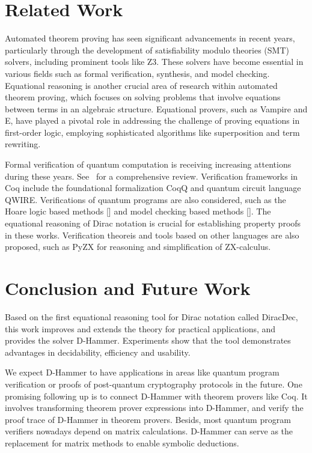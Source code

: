 
\section{Related Work}

Automated theorem proving has seen significant advancements in recent years, particularly through the development of satisfiability modulo theories (SMT) solvers,
including prominent tools like Z3. These solvers have become essential in various fields such as formal verification, synthesis, and model checking. 
Equational reasoning is another crucial area of research within automated theorem proving, which focuses on solving problems that involve equations between terms in an algebraic structure. 
Equational provers, such as Vampire and E, have played a pivotal role in addressing the challenge of proving equations in first-order logic, employing sophisticated algorithms like superposition and term rewriting.

Formal verification of quantum computation is receiving increasing attentions during these years. See~\cite{Lewis2023} for a comprehensive review. 
Verification frameworks in Coq include the foundational formalization CoqQ and quantum circuit language QWIRE. 
Verifications of quantum programs are also considered, such as the Hoare logic based methods [] and model checking based methods [].
The equational reasoning of Dirac notation is crucial for establishing property proofs in these works.
Verification theoreis and tools based on other languages are also proposed, such as PyZX for reasoning and simplification of ZX-calculus.




\section{Conclusion and Future Work}
Based on the first equational reasoning tool for Dirac notation called DiracDec, this work improves and extends the theory for practical applications, and provides the solver D-Hammer. Experiments show that the tool demonstrates advantages in decidability, efficiency and usability. 

We expect D-Hammer to have applications in areas like quantum program verification or proofs of post-quantum cryptography protocols in the future.
One promising following up is to connect D-Hammer with theorem provers like Coq. It involves transforming theorem prover expressions into D-Hammer, and verify the proof trace of D-Hammer in theorem provers. Besids, most quantum program verifiers nowadays depend on matrix calculations. D-Hammer can serve as the replacement for matrix methods to enable symbolic deductions.

